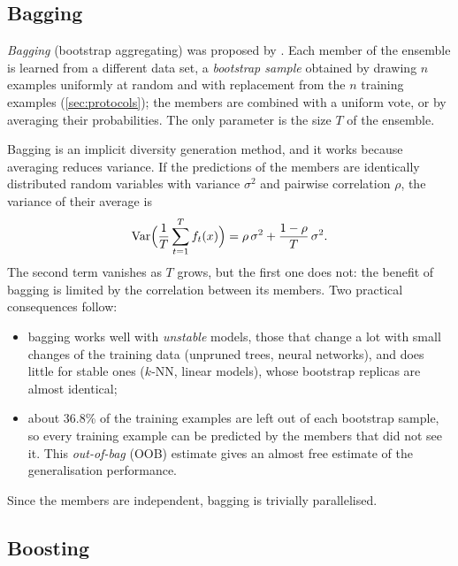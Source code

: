 \subsection{Bagging}

\emph{Bagging} (bootstrap aggregating) was proposed by \citet{breiman1996bagging}. Each member of
the ensemble is learned from a different data set, a \emph{bootstrap sample} obtained by drawing
$n$ examples uniformly at random and with replacement from the $n$ training examples
(\cref{sec:protocols}); the members are combined with a uniform vote, or by averaging their
probabilities. The only parameter is the size $T$ of the ensemble.

Bagging is an implicit diversity generation method, and it works because averaging reduces
variance. If the predictions of the members are identically distributed random variables with
variance $\sigma^2$ and pairwise correlation $\rho$, the variance of their average is
\citep[Section~15.2]{hastie2009elements}
\begin{equation}\label{eq:avgvar}
  \operatorname{Var}\Bigl(\frac1T\sum_{t=1}^{T}f_t(x)\Bigr)=\rho\,\sigma^2+\frac{1-\rho}{T}\,\sigma^2 .
\end{equation}
The second term vanishes as $T$ grows, but the first one does not: the benefit of bagging is
limited by the correlation between its members. Two practical consequences follow:
\begin{itemize}
  \item bagging works well with \emph{unstable} models, those that change a lot with small
        changes of the training data (unpruned trees, neural networks), and does little for
        stable ones ($k$-NN, linear models), whose bootstrap replicas are almost identical;
  \item about 36.8\% of the training examples are left out of each bootstrap sample, so every
        training example can be predicted by the members that did not see it. This
        \emph{out-of-bag} (OOB) estimate gives an almost free estimate of the generalisation
        performance.
\end{itemize}
Since the members are independent, bagging is trivially parallelised.

\subsection{Boosting}

